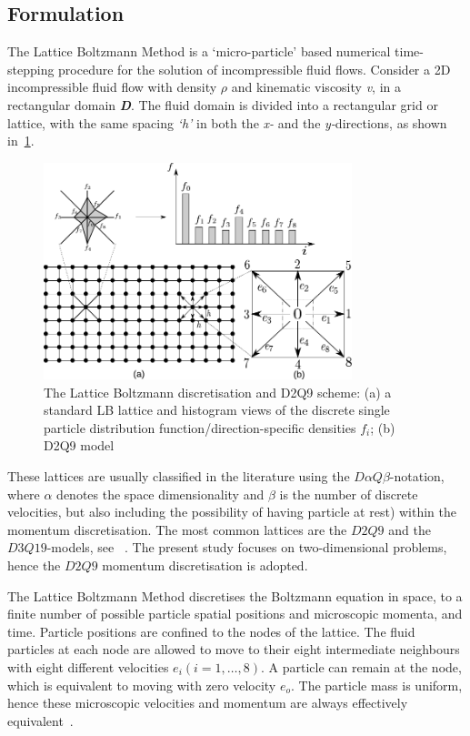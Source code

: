 \subsection{Formulation}
The Lattice Boltzmann Method is a `micro-particle' based numerical time-stepping procedure for the solution of incompressible fluid flows. Consider a 2D incompressible fluid flow with density $\rho$ and kinematic viscosity \textit{v}, in a rectangular domain \textit{\textbf{D}}. The fluid domain is divided into a rectangular grid or lattice, with the same spacing \textit{`h'} in both the \textit{x-} and the \textit{y-}directions, as shown in~\cref{fig:D2Q9}. 

\begin{figure}[htpb]
\centering
\includegraphics[width=0.8\textwidth]{Chapter3/figures/lbm/D2Q9.pdf}
\caption[The Lattice Boltzmann discretisation and D2Q9 scheme]{The Lattice Boltzmann discretisation and D2Q9 scheme: (a) a standard LB lattice and histogram views of the discrete single particle distribution function/direction-specific densities $f_i$; (b) D2Q9 model}
\label{fig:D2Q9}
\end{figure}

These lattices are usually classified in the literature using the $\mathit{D}\alpha\mathit{Q}\beta$-notation, where $\alpha$ denotes the space dimensionality and $\beta$ is the number of discrete velocities, but also including the possibility of having particle at rest) within the momentum discretisation. The most common lattices are the $\mathit{D2Q9}$ and the $\mathit{D3Q19}$-models, see ~\citet{He1997}. The present study focuses on two-dimensional problems, hence the $\mathit{D2Q9}$ momentum discretisation is adopted.

The Lattice Boltzmann Method discretises the Boltzmann equation in space, to a finite number of possible particle spatial positions and microscopic momenta, and time. Particle positions are confined to the nodes of the lattice. The fluid particles at each node are allowed to move to their eight intermediate neighbours with eight different velocities $\mathit{e_i} (\mathit{i}=1,\dots,8)$. A particle can remain at the node, which is equivalent to moving with zero velocity $\mathit{e_o}$. The particle mass is uniform, hence these microscopic velocities and momentum are always effectively equivalent~\citep{Han2007}.

